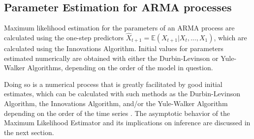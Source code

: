 \subsection{Parameter Estimation for ARMA processes}

Maximum likelihood estimation for the parameters of an ARMA process are calculated using the one-step predictors $\hat{X}_{t+1} = \mathbb{E}(X_{t+1}|X_t,...,X_1)$, which are calculated using the Innovations Algorithm. Initial values for parameters estimated numerically are obtained with either the Durbin-Levinson or Yule-Walker Algorithms, depending on the order of the model in question.













Doing so is a numerical process that is greatly facilitated by good initial estimates, which can be calculated with such methods as the Durbin-Levinson Algorithm, the Innovations Algorithm, and/or the Yule-Walker Algorithm depending on the order of the time series \citep{BrockwellDavis1991}. The asymptotic behavior of the Maximum Likelihood Estimator and its implications on inference are discussed in the next section.





 





















